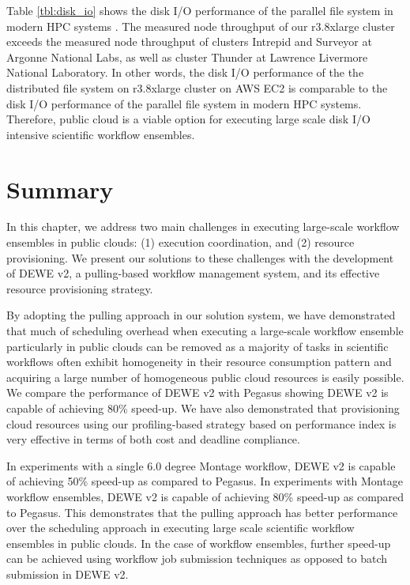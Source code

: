 Table \ref{tbl:disk_io} shows the disk I/O performance of the parallel file system in modern HPC systems \cite{borrill2009hpc}. The measured node throughput of our r3.8xlarge cluster exceeds the measured node throughput of clusters Intrepid and Surveyor at Argonne National Labs, as well as cluster Thunder at Lawrence Livermore National Laboratory. In other words, the disk I/O performance of the the distributed file system on r3.8xlarge cluster on AWS EC2 is comparable to the disk I/O performance of the parallel file system in modern HPC systems. Therefore, public cloud is a viable option for executing large scale disk I/O intensive scientific workflow ensembles.


\section{Summary}
\label{v2_sec:summary}

In this chapter, we address two main challenges in executing large-scale workflow ensembles in public clouds: (1) execution coordination, and (2) resource provisioning. We present our solutions to these challenges with the development of DEWE v2, a pulling-based workflow management system, and its effective resource provisioning strategy. 

By adopting the pulling approach in our solution system, we have demonstrated that much of scheduling overhead when executing a large-scale workflow ensemble particularly in public clouds can be removed as a majority of tasks in scientific workflows often exhibit homogeneity in their resource consumption pattern and acquiring a large number of homogeneous public cloud resources is easily possible. We compare the performance of DEWE v2 with Pegasus showing DEWE v2 is capable of achieving 80\% speed-up. We have also demonstrated that provisioning cloud resources using our profiling-based strategy based on performance index is very effective in terms of both cost and deadline compliance.

In experiments with a single 6.0 degree Montage workflow, DEWE v2 is capable of achieving 50\% speed-up as compared to Pegasus. In experiments with Montage workflow ensembles, DEWE v2 is capable of achieving 80\% speed-up as compared to Pegasus. This demonstrates that the pulling approach has better performance over the scheduling approach in executing large scale scientific workflow ensembles in public clouds. In the case of workflow ensembles, further speed-up can be achieved using workflow job submission techniques as opposed to batch submission in DEWE v2.

